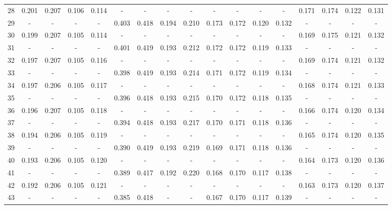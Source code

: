 \documentclass{report}
\begin{document}
\begin{appendices}
\begin{sidewaystable}
\begin{tabular}{|c|cccc|cccc|cccc|cccc|}
28 & 0.201 & 0.207 & 0.106 & 0.114 &   -   &   -   &   -   &   -   &   -   &   -   &   -   &   -   & 0.171 & 0.174 & 0.122 & 0.131\\
29 &   -   &   -   &   -   &   -   & 0.403 & 0.418 & 0.194 & 0.210 & 0.173 & 0.172 & 0.120 & 0.132 &   -   &   -   &   -   &   -  \\
30 & 0.199 & 0.207 & 0.105 & 0.114 &   -   &   -   &   -   &   -   &   -   &   -   &   -   &   -   & 0.169 & 0.175 & 0.121 & 0.132\\
31 &   -   &   -   &   -   &   -   & 0.401 & 0.419 & 0.193 & 0.212 & 0.172 & 0.172 & 0.119 & 0.133 &   -   &   -   &   -   &   -  \\
32 & 0.197 & 0.207 & 0.105 & 0.116 &   -   &   -   &   -   &   -   &   -   &   -   &   -   &   -   & 0.169 & 0.174 & 0.121 & 0.132\\
33 &   -   &   -   &   -   &   -   & 0.398 & 0.419 & 0.193 & 0.214 & 0.171 & 0.172 & 0.119 & 0.134 &   -   &   -   &   -   &   -  \\
34 & 0.197 & 0.206 & 0.105 & 0.117 &   -   &   -   &   -   &   -   &   -   &   -   &   -   &   -   & 0.168 & 0.174 & 0.121 & 0.133\\
35 &   -   &   -   &   -   &   -   & 0.396 & 0.418 & 0.193 & 0.215 & 0.170 & 0.172 & 0.118 & 0.135 &   -   &   -   &   -   &   -  \\
36 & 0.196 & 0.207 & 0.105 & 0.118 &   -   &   -   &   -   &   -   &   -   &   -   &   -   &   -   & 0.166 & 0.174 & 0.120 & 0.134\\
37 &   -   &   -   &   -   &   -   & 0.394 & 0.418 & 0.193 & 0.217 & 0.170 & 0.171 & 0.118 & 0.136 &   -   &   -   &   -   &   -  \\
38 & 0.194 & 0.206 & 0.105 & 0.119 &   -   &   -   &   -   &   -   &   -   &   -   &   -   &   -   & 0.165 & 0.174 & 0.120 & 0.135\\
39 &   -   &   -   &   -   &   -   & 0.390 & 0.419 & 0.193 & 0.219 & 0.169 & 0.171 & 0.118 & 0.136 &   -   &   -   &   -   &   -  \\
40 & 0.193 & 0.206 & 0.105 & 0.120 &   -   &   -   &   -   &   -   &   -   &   -   &   -   &   -   & 0.164 & 0.173 & 0.120 & 0.136\\
41 &   -   &   -   &   -   &   -   & 0.389 & 0.417 & 0.192 & 0.220 & 0.168 & 0.170 & 0.117 & 0.138 &   -   &   -   &   -   &   -  \\
42 & 0.192 & 0.206 & 0.105 & 0.121 &   -   &   -   &   -   &   -   &   -   &   -   &   -   &   -   & 0.163 & 0.173 & 0.120 & 0.137\\
43 &   -   &   -   &   -   &   -   & 0.385 & 0.418 &   -   &   -   & 0.167 & 0.170 & 0.117 & 0.139 &   -   &   -   &   -   &   -  \\

\end{tabular}
\end{sidewaystable}
\end{appendices}
\end{document}
